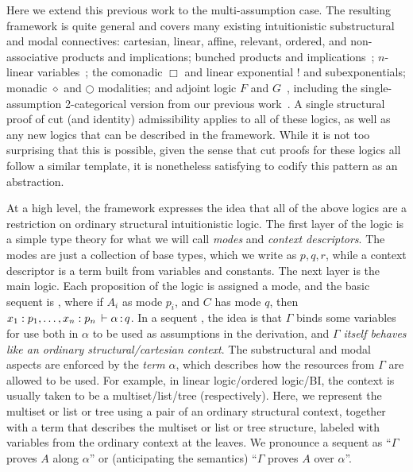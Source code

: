 Here we extend this previous work to the multi-assumption case.  The
resulting framework is quite general and covers many existing
intuitionistic substructural and modal connectives: cartesian, linear,
affine, relevant, ordered, and non-associative products and
implications; bunched products and implications~\citep{ohearnpymXXBI};
$n$-linear variables~\citep{jcreedXXnames}; the comonadic $\Box$ and
linear exponential $!$ and subexponentials; monadic $\diamond$ and
$\bigcirc$ modalities; and adjoint logic $F$ and
$G$~\citep{bentonwadler96adjoint,reed09adjoint}, including the
single-assumption 2-categorical version from our previous
work~\citep{ls16adjoint}.  A single structural~\citep{pfenning94cut}
proof of cut (and identity) admissibility applies to all of these
logics, as well as any new logics that can be described in the
framework.  While it is not too surprising that this is possible, given
the sense that cut proofs for these logics all follow a similar
template, it is nonetheless satisfying to codify this pattern as an
abstraction.

At a high level, the framework expresses the idea that all of the above
logics are a restriction on ordinary structural intuitionistic logic.
The first layer of the logic is a simple type theory for what we will
call \emph{modes} and \emph{context descriptors}.  The modes are just a
collection of base types, which we write as $p,q,r$, while a context
descriptor is a term built from variables and constants.  The next layer
is the main logic.  Each proposition of the logic is assigned a mode,
and the basic sequent is ,
where if $A_i$ as mode $p_i$, and $C$ has mode $q$, then $x_1 :
  p_1,\ldots, x_n : p_n \, \vdash \alpha \, \mathit{:} \, q$.  In a sequent
, the idea is that $\Gamma$ binds some variables
for use both in $\alpha$ to be used as assumptions in the derivation,
and \emph{$\Gamma$ itself behaves like an ordinary structural/cartesian
  context}.  The substructural and modal aspects are enforced by the
\emph{term} $\alpha$, which describes how the resources from $\Gamma$
are allowed to be used.  For example, in linear logic/ordered logic/BI,
the context is usually taken to be a multiset/list/tree (respectively).
Here, we represent the multiset or list or tree using a pair of an
ordinary structural context, together with a term that describes the
multiset or list or tree structure, labeled with variables from the
ordinary context at the leaves.  We pronounce a sequent
 as ``$\Gamma$ proves $A$ along $\alpha$'' or
(anticipating the semantics) ``$\Gamma$ proves $A$ over $\alpha$''.

